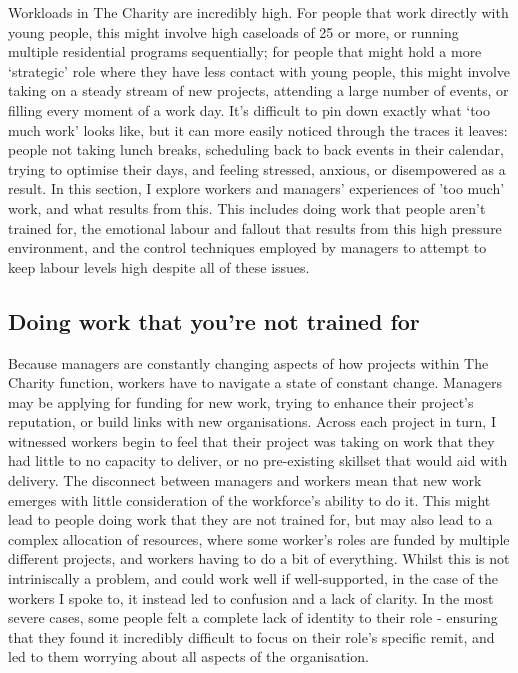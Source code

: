 Workloads in The Charity are incredibly high. For people that work directly with young people, this might involve high caseloads of 25 or more, or running multiple residential programs sequentially; for people that might hold a more ‘strategic’ role where they have less contact with young people, this might involve taking on a steady stream of new projects, attending a large number of events, or filling every moment of a work day. It’s difficult to pin down exactly  what ‘too much work’ looks like, but it can more easily noticed through the traces it leaves: people not taking lunch breaks, scheduling back to back events in their calendar, trying to optimise their days, and feeling stressed, anxious, or disempowered as a result. In this section, I explore workers and managers' experiences of 'too much' work, and what results from this. This includes doing work that people aren’t trained for, the emotional labour and fallout that results from this high pressure environment, and the control techniques employed by managers to attempt to keep labour levels high despite all of these issues. 

\subsection{Doing work that you’re not trained for}
Because managers are constantly changing aspects of how projects within The Charity function, workers have to navigate a state of constant change. Managers may be applying for funding for new work, trying to enhance their project’s reputation, or build links with new organisations. Across each project in turn, I witnessed workers begin to feel that their project was taking on work that they had little to no capacity to deliver, or no pre-existing skillset that would aid with delivery. The disconnect between managers and workers mean that new work emerges with little consideration of the workforce's ability to do it. This might lead to people doing work that they are not trained for, but may also lead to a complex allocation of resources, where some worker's roles are funded by multiple different projects, and workers having to do a bit of everything. Whilst this is not intriniscally a problem, and could work well if well-supported, in the case of the workers I spoke to, it instead led to confusion and a lack of clarity. In the most severe cases,  some people felt a complete lack of identity to their role - ensuring that they found it incredibly difficult to focus on their role's specific remit, and led to them worrying about all aspects of the organisation.

